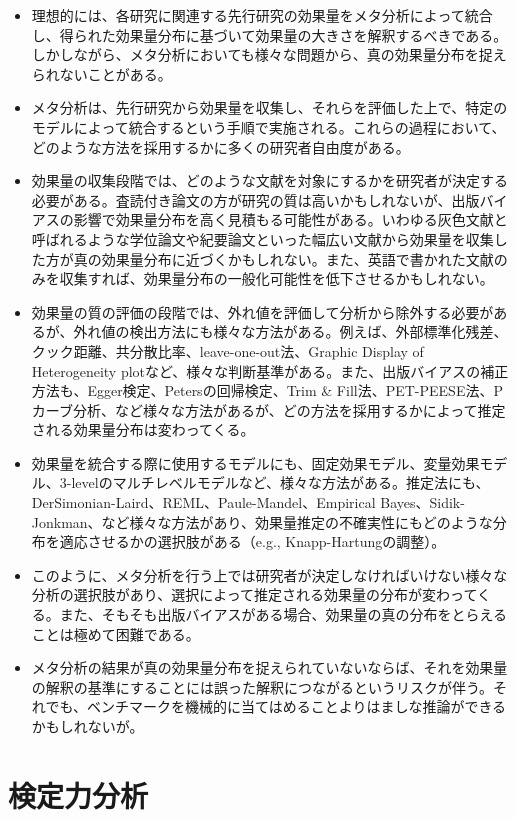 \documentclass[
  ja=standard, xelatex, base=12pt]{bxjsreport}
\begin{document}
\begin{itemize}
\item
  理想的には、各研究に関連する先行研究の効果量をメタ分析によって統合し、得られた効果量分布に基づいて効果量の大きさを解釈するべきである。しかしながら、メタ分析においても様々な問題から、真の効果量分布を捉えられないことがある。
\item
  メタ分析は、先行研究から効果量を収集し、それらを評価した上で、特定のモデルによって統合するという手順で実施される。これらの過程において、どのような方法を採用するかに多くの研究者自由度がある。
\item
  効果量の収集段階では、どのような文献を対象にするかを研究者が決定する必要がある。査読付き論文の方が研究の質は高いかもしれないが、出版バイアスの影響で効果量分布を高く見積もる可能性がある。いわゆる灰色文献と呼ばれるような学位論文や紀要論文といった幅広い文献から効果量を収集した方が真の効果量分布に近づくかもしれない。また、英語で書かれた文献のみを収集すれば、効果量分布の一般化可能性を低下させるかもしれない。
\item
  効果量の質の評価の段階では、外れ値を評価して分析から除外する必要があるが、外れ値の検出方法にも様々な方法がある。例えば、外部標準化残差、クック距離、共分散比率、leave-one-out法、Graphic Display of Heterogeneity plotなど、様々な判断基準がある。また、出版バイアスの補正方法も、Egger検定、Petersの回帰検定、Trim \& Fill法、PET-PEESE法、Pカーブ分析、など様々な方法があるが、どの方法を採用するかによって推定される効果量分布は変わってくる。
\item
  効果量を統合する際に使用するモデルにも、固定効果モデル、変量効果モデル、3-levelのマルチレベルモデルなど、様々な方法がある。推定法にも、DerSimonian-Laird、REML、Paule-Mandel、Empirical Bayes、Sidik-Jonkman、など様々な方法があり、効果量推定の不確実性にもどのような分布を適応させるかの選択肢がある（e.g., Knapp-Hartungの調整）。
\item
  このように、メタ分析を行う上では研究者が決定しなければいけない様々な分析の選択肢があり、選択によって推定される効果量の分布が変わってくる。また、そもそも出版バイアスがある場合、効果量の真の分布をとらえることは極めて困難である。
\item
  メタ分析の結果が真の効果量分布を捉えられていないならば、それを効果量の解釈の基準にすることには誤った解釈につながるというリスクが伴う。それでも、ベンチマークを機械的に当てはめることよりはましな推論ができるかもしれないが。
\end{itemize}

\hypertarget{ux691cux5b9aux529bux5206ux6790}{%
\chapter{検定力分析}\label{ux691cux5b9aux529bux5206ux6790}}
\end{document}
